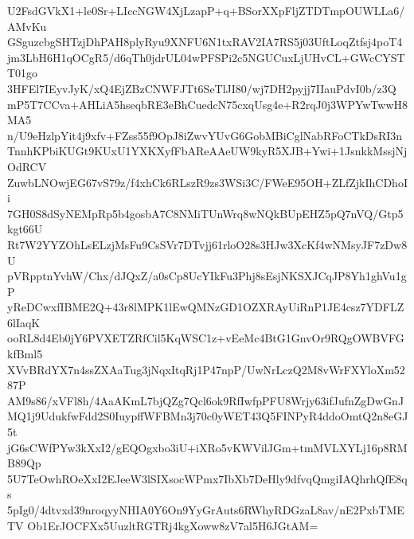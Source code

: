 U2FsdGVkX1+le0Sr+LIccNGW4XjLzapP+q+BSorXXpFljZTDTmpOUWLLa6/AMvKu
GSguzcbgSHTzjDhPAH8plyRyu9XNFU6N1txRAV2IA7RS5j03UftLoqZtfsj4poT4
jm3LbH6H1qOCgR5/d6qTh0jdrUL04wPFSPi2c5NGUCuxLjUHvCL+GWcCYSTT01go
3HFEl7IEyvJyK/xQ4EjZBzCNWFJTt6SeTlJI80/wj7DH2pyjj7IIauPdvI0b/z3Q
mP5T7CCva+AHLiA5hseqbRE3eBhCuedcN75cxqUsg4e+R2rqJ0j3WPYwTwwH8MA5
n/U9eHzlpYit4j9xfv+FZss55f9OpJ8iZwvYUvG6GobMBiCglNabRFoCTkDsRI3n
TnnhKPbiKUGt9KUxU1YXKXyfFbAReAAeUW9kyR5XJB+Ywi+1JsnkkMssjNjOdRCV
ZuwbLNOwjEG67vS79z/f4xhCk6RLszR9zs3WSi3C/FWeE95OH+ZLfZjkIhCDhoIi
7GH0S8dSyNEMpRp5b4gosbA7C8NMiTUnWrq8wNQkBUpEHZ5pQ7nVQ/Gtp5kgt66U
Rt7W2YYZOhLsELzjMsFu9CsSVr7DTvjj61rloO28s3HJw3XcKf4wNMsyJF7zDw8U
pVRpptnYvhW/Chx/dJQxZ/a0sCp8UcYIkFu3Phj8sEsjNKSXJCqJP8Yh1ghVu1gP
yReDCwxfIBME2Q+43r8lMPK1lEwQMNzGD1OZXRAyUiRnP1JE4csz7YDFLZ6lIaqK
ooRL8d4Eb0jY6PVXETZRfCil5KqWSC1z+vEeMc4BtG1GnvOr9RQgOWBVFGkfBml5
XVvBRdYX7n4ssZXAaTug3jNqxItqRj1P47npP/UwNrLczQ2M8vWrFXYloXm5287P
AM9s86/xVFl8h/4AaAKmL7bjQZg7Qcl6ok9RfIwfpPFU8Wrjy63ifJufnZgDwGnJ
MQ1j9UdukfwFdd2S0IuypffWFBMn3j70c0yWET43Q5FINPyR4ddoOmtQ2n8eGJ5t
jG6sCWfPYw3kXxI2/gEQOgxbo3iU+iXRo5vKWVilJGm+tmMVLXYLj16p8RMB89Qp
5U7TeOwhROeXxI2EJeeW3lSIXsocWPmx7IbXb7DeHly9dfvqQmgiIAQhrhQfE8qs
5pIg0/4dtvxd39nroqyyNHIA0Y6On9YyGrAuts6RWhyRDGzaL8av/nE2PxbTMETV
Ob1ErJOCFXx5UuzltRGTRj4kgXoww8zV7al5H6JGtAM=

